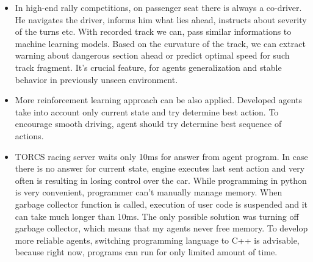 \documentclass[declaration,shortabstract,english,inz]{iithesis}
\begin{document}
\begin{itemize}
    \item In high-end rally competitions, on passenger seat there is always a co-driver.
    He navigates the driver, informs him what lies ahead, instructs about severity of the turns etc. With recorded track we can, pass similar informations to machine learning models. Based on the curvature of the track, we can extract warning about dangerous section ahead or predict optimal speed for such track fragment.
    It's crucial feature, for agents generalization and stable behavior in previously unseen environment.

    \item More reinforcement learning approach can be also applied.
    Developed agents take into account only current state and try determine best action.
    To encourage smooth driving, agent should try determine best sequence of actions.

    \item TORCS racing server waits only 10ms for answer from agent program.
In case there is no answer for current state, engine executes last sent action and very often is resulting in losing control over the car.
While programming in python is very convenient, programmer can't manually manage memory.
When garbage collector function is called, execution of user code is suspended and it can take much longer than 10ms.
The only possible solution was turning off garbage collector, which means that my agents never free memory.
To develop more reliable agents, switching programming language to C++ is advisable, because right now, programs can run for only limited amount of time.
\end{itemize}


\end{document}
